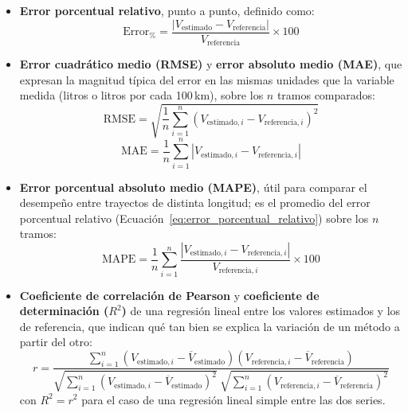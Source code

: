 \begin{itemize}
	\item \textbf{Error porcentual relativo}, punto a punto, definido como:
	\begin{equation}
		\text{Error}_{\%} = \frac{|V_{\text{estimado}} - V_{\text{referencia}}|}{V_{\text{referencia}}} \times 100
		\label{eq:error_porcentual_relativo}
	\end{equation}
	\item \textbf{Error cuadrático medio (RMSE)} y \textbf{error absoluto medio (MAE)}, que expresan la magnitud típica del error en las mismas unidades que la variable medida (litros o litros por cada 100\,km), sobre los $n$ tramos comparados:
	\begin{equation}
		\text{RMSE} = \sqrt{\frac{1}{n}\sum_{i=1}^{n}\left(V_{\text{estimado},i} - V_{\text{referencia},i}\right)^2}
		\label{eq:rmse}
	\end{equation}
	\begin{equation}
		\text{MAE} = \frac{1}{n}\sum_{i=1}^{n}\left|V_{\text{estimado},i} - V_{\text{referencia},i}\right|
		\label{eq:mae}
	\end{equation}
	\item \textbf{Error porcentual absoluto medio (MAPE)}, útil para comparar el desempeño entre trayectos de distinta longitud; es el promedio del error porcentual relativo (Ecuación~\ref{eq:error_porcentual_relativo}) sobre los $n$ tramos:
	\begin{equation}
		\text{MAPE} = \frac{1}{n}\sum_{i=1}^{n}\frac{\left|V_{\text{estimado},i} - V_{\text{referencia},i}\right|}{V_{\text{referencia},i}} \times 100
		\label{eq:mape}
	\end{equation}
	\item \textbf{Coeficiente de correlación de Pearson} y \textbf{coeficiente de determinación ($R^2$)} de una regresión lineal entre los valores estimados y los de referencia, que indican qué tan bien se explica la variación de un método a partir del otro:
	\begin{equation}
		r = \frac{\displaystyle\sum_{i=1}^{n}\left(V_{\text{estimado},i}-\overline{V}_{\text{estimado}}\right)\left(V_{\text{referencia},i}-\overline{V}_{\text{referencia}}\right)}{\sqrt{\displaystyle\sum_{i=1}^{n}\left(V_{\text{estimado},i}-\overline{V}_{\text{estimado}}\right)^2}\ \sqrt{\displaystyle\sum_{i=1}^{n}\left(V_{\text{referencia},i}-\overline{V}_{\text{referencia}}\right)^2}}
		\label{eq:pearson_r}
	\end{equation}
	con $R^2 = r^2$ para el caso de una regresión lineal simple entre las dos series.

\end{itemize}

